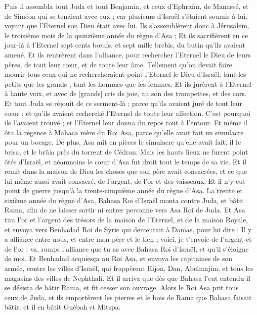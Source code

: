 \begin{multicols}{2}
Puis il assembla tout Juda et tout Benjamin, et ceux d'Ephraïm, de Manassé, et de Siméon qui se tenaient avec eux ; car plusieurs d'Israël s'étaient soumis à lui, voyant que l'Eternel son Dieu était avec lui.
Ils s'assemblèrent donc à Jérusalem, le troisième mois de la quinzième année du règne d'Asa ;
Et ils sacrifièrent en ce jour-là à l'Eternel sept cents bœufs, et sept mille brebis, du butin qu'ils avaient amené.
Et ils rentrèrent dans l'alliance, pour rechercher l'Eternel le Dieu de leurs pères, de tout leur cœur, et de toute leur âme.
Tellement qu'on devait faire mourir tous ceux qui ne rechercheraient point l'Eternel le Dieu d'Israël, tant les petits que les grands ; tant les hommes que les femmes.
Et ils jurèrent à l'Eternel à haute voix, et avec de [grands] cris de joie, au son des trompettes, et des cors.
Et tout Juda se réjouit de ce serment-là ; parce qu'ils avaient juré de tout leur cœur ; et qu'ils avaient recherché l'Eternel de toute leur affection. C'est pourquoi ils l'avaient trouvé ; et l'Eternel leur donna du repos tout à l'entour.
Et même il ôta la régence à Mahaca mère du Roi Asa, parce qu'elle avait fait un simulacre pour un bocage. De plus, Asa mit en pièces le simulacre qu'elle avait fait, il le brisa, et le brûla près du torrent de Cédron.
Mais les hauts lieux ne furent point ôtés d'Israël, et néanmoins le cœur d'Asa fut droit tout le temps de sa vie.
Et il remit dans la maison de Dieu les choses que son père avait consacrées, et ce que lui-même aussi avait consacré, de l'argent, de l'or et des vaisseaux.
Et il n'y eut point de guerre jusqu'à la trente-cinquième année du règne d'Asa.
\VerseOne{}La trente et sixième année du règne d'Asa, Bahasa Roi d'Israël monta contre Juda, et bâtit Rama, afin de ne laisser sortir ni entrer personne vers Asa Roi de Juda.
Et Asa tira l'or et l'argent des trésors de la maison de l'Eternel, et de la maison Royale, et envoya vers Benhadad Roi de Syrie qui demeurait à Damas, pour lui dire :
Il y a alliance entre nous, et entre mon père et le tien ; voici, je t'envoie de l'argent et de l'or ; va, romps l'alliance que tu as avec Bahasa Roi d'Israël, et qu'il s'éloigne de moi.
Et Benhadad acquiesça au Roi Asa, et envoya les capitaines de son armée, contre les villes d'Israël, qui frappèrent Hijon, Dan, Abelmajim, et tous les magasins des villes de Nephthali.
Et il arriva que dès que Bahasa l'eut entendu il se désista de bâtir Rama, et fit cesser son ouvrage.
Alors le Roi Asa prit tous ceux de Juda, et ils emportèrent les pierres et le bois de Rama que Bahasa faisait bâtir, et il en bâtit Guébah et Mitspa.

\end{multicols}
